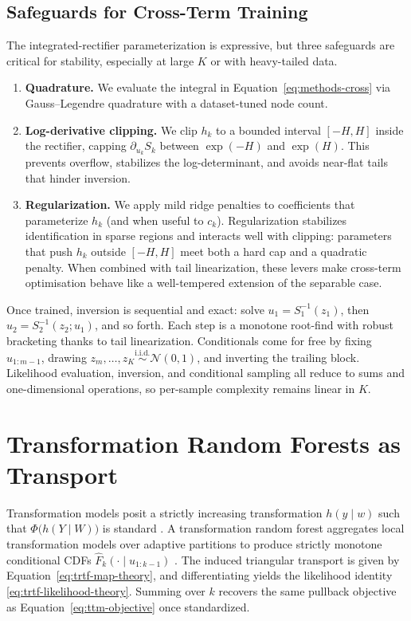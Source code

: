 \documentclass[11pt,a4paper,twoside]{book}\usepackage[]{graphicx}\usepackage[]{xcolor}
\begin{document}
\subsection{Safeguards for Cross-Term Training}

The integrated-rectifier parameterization is expressive, but three safeguards are critical for stability, especially at large $K$ or with heavy-tailed data.
\begin{enumerate}
  \item \textbf{Quadrature.} We evaluate the integral in Equation~\eqref{eq:methods-cross} via Gauss--Legendre quadrature with a dataset-tuned node count.
  \item \textbf{Log-derivative clipping.} We clip $h_k$ to a bounded interval $[-H,H]$ inside the rectifier, capping $\partial_{u_k}S_k$ between $\exp(-H)$ and $\exp(H)$. This prevents overflow, stabilizes the log-determinant, and avoids near-flat tails that hinder inversion.
  \item \textbf{Regularization.} We apply mild ridge penalties to coefficients that parameterize $h_k$ (and when useful to $c_k$). Regularization stabilizes identification in sparse regions and interacts well with clipping: parameters that push $h_k$ outside $[-H,H]$ meet both a hard cap and a quadratic penalty. When combined with tail linearization, these levers make cross-term optimisation behave like a well-tempered extension of the separable case.
\end{enumerate}

Once trained, inversion is sequential and exact: solve $u_1=S_1^{-1}(z_1)$, then $u_2=S_2^{-1}(z_2;u_1)$, and so forth. Each step is a monotone root-find with robust bracketing thanks to tail linearization. Conditionals come for free by fixing $u_{1:m-1}$, drawing $z_m,\dots,z_K \stackrel{\text{i.i.d.}}{\sim} \mathcal{N}(0,1)$, and inverting the trailing block. Likelihood evaluation, inversion, and conditional sampling all reduce to sums and one-dimensional operations, so per-sample complexity remains linear in $K$.

\section{Transformation Random Forests as Transport}

Transformation models posit a strictly increasing transformation $h(y\mid w)$ such that $\Phi\big(h(Y\mid W)\big)$ is standard \citep{hothorn2018conditional}. A transformation random forest aggregates local transformation models over adaptive partitions to produce strictly monotone conditional CDFs $\widehat{F}_k(\cdot \mid u_{1:k-1})$ \citep{hothorn2017transformation,hothorn2021transformation}. The induced triangular transport is given by Equation~\eqref{eq:trtf-map-theory}, and differentiating yields the likelihood identity \eqref{eq:trtf-likelihood-theory}. Summing over $k$ recovers the same pullback objective as Equation~\eqref{eq:ttm-objective} once standardized.
\end{document}

